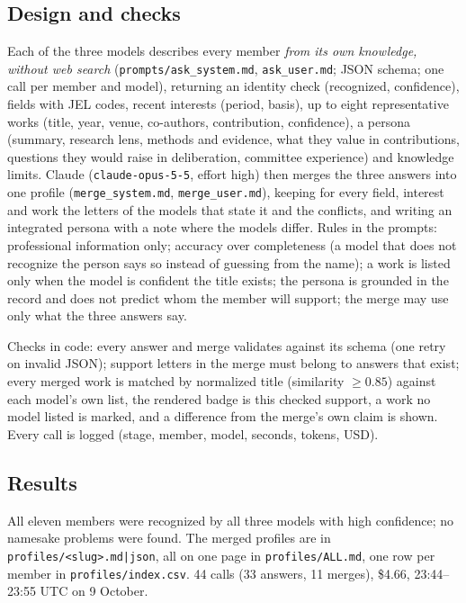 \documentclass[11pt,a4paper]{article}
\newcommand{\code}[1]{\texttt{#1}}
\begin{document}
\subsection{Design and checks}

Each of the three models describes every member \emph{from its own knowledge, without web search}
(\code{prompts/ask\_system.md}, \code{ask\_user.md}; JSON schema; one call per member and model), returning an
identity check (recognized, confidence), fields with JEL codes, recent interests (period, basis), up to eight
representative works (title, year, venue, co-authors, contribution, confidence), a persona (summary, research lens,
methods and evidence, what they value in contributions, questions they would raise in deliberation, committee
experience) and knowledge limits. Claude (\code{claude-opus-5-5}, effort high) then merges the three answers into one
profile (\code{merge\_system.md}, \code{merge\_user.md}), keeping for every field, interest and work the letters of
the models that state it and the conflicts, and writing an integrated persona with a note where the models differ.
Rules in the prompts: professional information only; accuracy over completeness (a model that does not recognize
the person says so instead of guessing from the name); a work is listed only when the model is confident the title
exists; the persona is grounded in the record and does not predict whom the member will support; the merge may use
only what the three answers say.

Checks in code: every answer and merge validates against its schema (one retry on invalid JSON); support letters in
the merge must belong to answers that exist; every merged work is matched by normalized title (similarity
$\geq 0.85$) against each model's own list, the rendered badge is this checked support, a work no model listed is
marked, and a difference from the merge's own claim is shown. Every call is logged (stage, member, model, seconds,
tokens, USD).

\subsection{Results}

All eleven members were recognized by all three models with high confidence; no namesake problems were found. The
merged profiles are in \code{profiles/<slug>.md|json}, all on one page in \code{profiles/ALL.md}, one row per member
in \code{profiles/index.csv}. 44 calls (33 answers, 11 merges), \$4.66, 23:44--23:55 UTC on 9 October.
\end{document}
